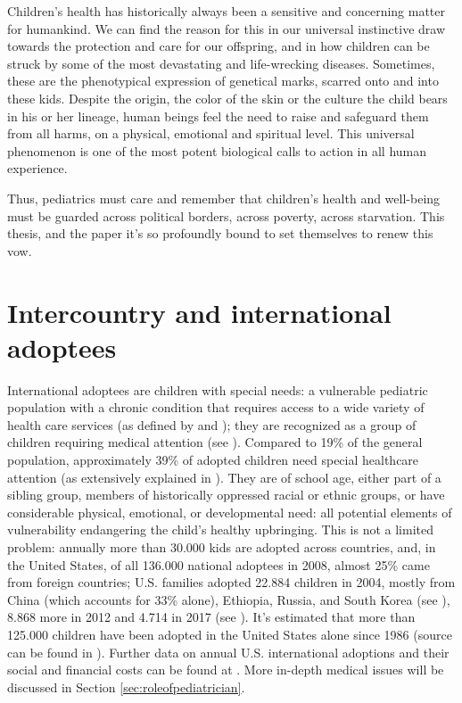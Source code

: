 

\label{chap:introduction}
Children's health has historically always been a sensitive and concerning matter for humankind. We can find the reason for this in our universal instinctive draw towards the protection and care for our offspring, and in how children can be struck by some of the most devastating and life-wrecking diseases. Sometimes, these are the phenotypical expression of genetical marks, scarred onto and into these kids. Despite the origin, the color of the skin or the culture the child bears in his or her lineage, human beings feel the need to raise and safeguard them from all harms, on a physical, emotional and spiritual level. This universal phenomenon is one of the most potent biological calls to action in all human experience.

Thus, pediatrics must care and remember that children's health and well-being must be guarded across political borders, across poverty, across starvation. This thesis, and the paper it's so profoundly bound to set themselves to renew this vow.

\section{Intercountry and international adoptees}\label{sec:internationaladoptees}
International adoptees are children with special needs: a vulnerable pediatric population with a chronic condition that requires access to a wide variety of health care services (as defined by \cite{notonlyinfectious} and \cite{nonsoloinfezioni}); they are recognized as a group of children requiring medical attention (see \cite{caringfor}). Compared to 19\% of the general population, approximately 39\% of adopted children need special healthcare attention (as extensively explained in \cite{nelson}). They are of school age, either part of a sibling group, members of historically oppressed racial or ethnic groups, or have considerable physical, emotional, or developmental need: all potential elements of vulnerability endangering the child's healthy upbringing. This is not a limited problem: annually more than 30.000 kids are adopted across countries, and, in the United States, of all 136.000 national adoptees in 2008, almost 25\% came from foreign countries; U.S. families adopted 22.884 children in 2004, mostly from China (which accounts for 33\% alone), Ethiopia, Russia, and South Korea (see \cite{nelson}), 8.868 more in 2012 and 4.714 in 2017 (see \cite{usreport}). It's estimated that more than 125.000 children have been adopted in the United States alone since 1986 (source can be found in \cite{caringfor}). Further data on annual U.S. international adoptions and their social and financial costs can be found at \cite{usreportsite}. More in-depth medical issues will be discussed in Section \ref{sec:roleofpediatrician}.

